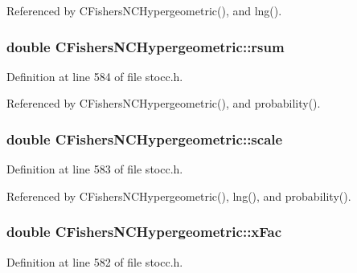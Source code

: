 Referenced by C\-Fishers\-N\-C\-Hypergeometric(), and lng().

\subsubsection[{rsum}]{\setlength{\rightskip}{0pt plus 5cm}double C\-Fishers\-N\-C\-Hypergeometric\-::rsum\hspace{0.3cm}{\ttfamily [protected]}}\label{class_c_fishers_n_c_hypergeometric_a2237d46d2b92c592e3e8d5450ba4af46}


Definition at line 584 of file stocc.\-h.



Referenced by C\-Fishers\-N\-C\-Hypergeometric(), and probability().

\subsubsection[{scale}]{\setlength{\rightskip}{0pt plus 5cm}double C\-Fishers\-N\-C\-Hypergeometric\-::scale\hspace{0.3cm}{\ttfamily [protected]}}\label{class_c_fishers_n_c_hypergeometric_ad20fbfcd86d0f33f23f66e9b79b3f734}


Definition at line 583 of file stocc.\-h.



Referenced by C\-Fishers\-N\-C\-Hypergeometric(), lng(), and probability().

\subsubsection[{x\-Fac}]{\setlength{\rightskip}{0pt plus 5cm}double C\-Fishers\-N\-C\-Hypergeometric\-::x\-Fac\hspace{0.3cm}{\ttfamily [protected]}}\label{class_c_fishers_n_c_hypergeometric_aae5b151837f1ab4e71266cfee752d922}


Definition at line 582 of file stocc.\-h.



